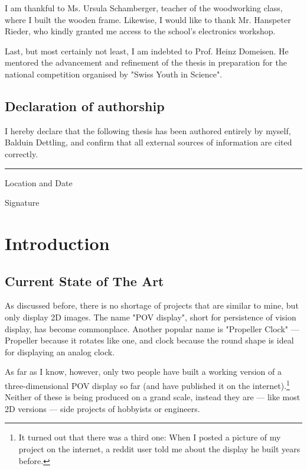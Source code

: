\documentclass[a4paper, 11pt, titlepage]{report}
\begin{document}
I am thankful to Ms. Ursula Schamberger, teacher of the woodworking class, where I built the
wooden frame. Likewise, I would like to thank Mr. Hanspeter Rieder, who kindly granted me
access to the school's electronics workshop.

Last, but most certainly not least, I am indebted to Prof. Heinz Domeisen. He mentored the
advancement and refinement of the thesis in preparation for the national competition organised
by "Swiss Youth in Science".

\section*{Declaration of authorship}

I hereby declare that the following thesis has been authored entirely by myself, Balduin
Dettling, and confirm that all external sources of information are cited correctly.

\vspace{10mm}
\rule{\textwidth}{0.5pt}
\begin{minipage}[t]{0.5\textwidth}
Location and Date
\end{minipage}
\begin{minipage}[t]{0.5\textwidth}
\hspace{-1mm}Signature
\end{minipage}


\tableofcontents



\chapter{Introduction}


\section{Current State of The Art}

As discussed before, there is no shortage of projects that are similar to mine, but only
display 2D images. The name "POV display", short for persistence of vision display, has become
commonplace. Another popular name is "Propeller Clock" --- Propeller because it rotates like one,
and clock because the round shape is ideal for displaying an analog clock.

As far as I know, however, only two people have built a working version of a three-dimensional
POV display so far (and have published it on the internet).\footnote{It turned out that there was
a third one: When I posted a picture of my project on the internet, a reddit user told me about
the display he built years before.}
Neither of these is being produced on a grand scale, instead they are --- like most 2D versions
--- side projects of hobbyists or engineers.
\end{document}
